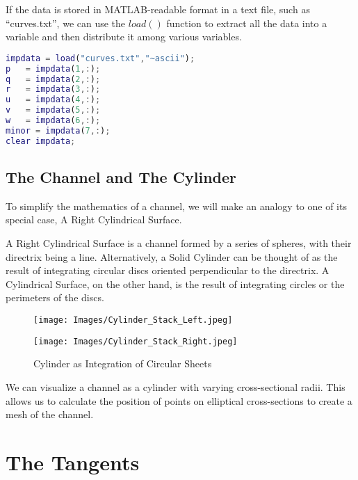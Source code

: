 \documentclass[a4paper]{article}
\begin{document}
If the data is stored in MATLAB-readable format in a text file, such as “curves.txt”, we can use the \(load()\) function to extract all the data into a variable and then distribute it among various variables.
\\
\begin{lstlisting}[language=matlab]
impdata = load("curves.txt","~ascii");
p   = impdata(1,:);
q   = impdata(2,:);
r   = impdata(3,:);
u   = impdata(4,:);
v   = impdata(5,:);
w   = impdata(6,:);
minor = impdata(7,:);
clear impdata;

\end{lstlisting}
\hypertarget{the-channel-and-the-cylinder}{%
\subsection{The Channel and The
Cylinder}\label{the-channel-and-the-cylinder}}

To simplify the mathematics of a channel, we will make an analogy to one of its special case, A Right Cylindrical Surface.

A Right Cylindrical Surface is a channel formed by a series of spheres, with their directrix being a line. Alternatively, a Solid Cylinder can be thought of as the result of integrating circular discs oriented perpendicular to the directrix. A Cylindrical Surface, on the other hand, is the result of integrating circles or the perimeters of the discs.

\begin{figure}[h]
    \centering
   \texttt{[image: Images/Cylinder\_Stack\_Left.jpeg]}
   
    \texttt{[image: Images/Cylinder\_Stack\_Right.jpeg]}
    \caption{Cylinder as Integration of Circular Sheets}
\end{figure}

We can visualize a channel as a cylinder with varying cross-sectional radii. This allows us to calculate the position of points on elliptical cross-sections to create a mesh of the channel.
\newpage
\hypertarget{the-tangents}{%
\section{The Tangents}\label{the-tangents}}
\end{document}
